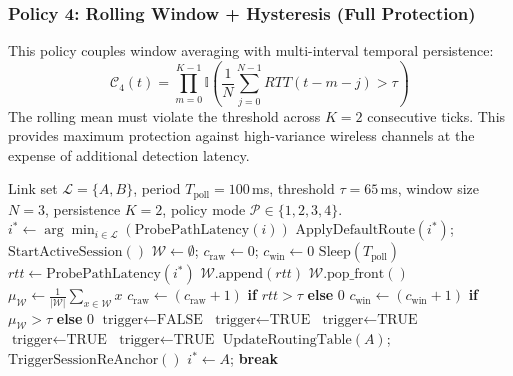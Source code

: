 \documentclass[conference]{IEEEtran}
\begin{document}
{\subsubsection{Policy 4: Rolling Window + Hysteresis (Full Protection)}
This policy couples window averaging with multi-interval temporal persistence:
\begin{equation}
\mathcal{C}_{4}(t) = \prod_{m=0}^{K-1} \mathbb{I}\left( \frac{1}{N}\sum_{j=0}^{N-1} RTT(t - m - j) > \tau \right)
\end{equation}
The rolling mean must violate the threshold across $K=2$ consecutive ticks. This provides maximum protection against high-variance wireless channels at the expense of additional detection latency.
}

\begin{algorithm}[htbp]
\caption{\textcolor{extensioncolor}{Unified Steering Engine with $2 \times 2$ Policy Selection}}
\label{alg:steering}
\begin{algorithmic}[1]
\REQUIRE Link set $\mathcal{L} = \{A, B\}$, period $T_{\text{poll}} = 100$\,ms, threshold $\tau = 65$\,ms, window size $N = 3$, persistence $K = 2$, policy mode $\mathcal{P} \in \{1, 2, 3, 4\}$.
\STATE $i^* \leftarrow \arg\min_{i \in \mathcal{L}} (\text{ProbePathLatency}(i))$
\STATE $\text{ApplyDefaultRoute}(i^*)$; \quad $\text{StartActiveSession}()$
\STATE $\mathcal{W} \leftarrow \emptyset$; \quad $c_{\text{raw}} \leftarrow 0$; \quad $c_{\text{win}} \leftarrow 0$
    \STATE $\text{Sleep}(T_{\text{poll}})$
    \STATE $rtt \leftarrow \text{ProbePathLatency}(i^*)$
    \STATE $\mathcal{W}.\text{append}(rtt)$
        \STATE $\mathcal{W}.\text{pop\_front}()$
    \ENDIF
    \STATE $\mu_{\mathcal{W}} \leftarrow \frac{1}{|\mathcal{W}|}\sum_{x \in \mathcal{W}} x$
    \STATE $c_{\text{raw}} \leftarrow (c_{\text{raw}} + 1)$ \textbf{if} $rtt > \tau$ \textbf{else} $0$
    \STATE $c_{\text{win}} \leftarrow (c_{\text{win}} + 1)$ \textbf{if} $\mu_{\mathcal{W}} > \tau$ \textbf{else} $0$
    \STATE $\text{trigger} \leftarrow \text{FALSE}$
     \STATE $\text{trigger} \leftarrow \text{TRUE}$
     \STATE $\text{trigger} \leftarrow \text{TRUE}$
     \STATE $\text{trigger} \leftarrow \text{TRUE}$
     \STATE $\text{trigger} \leftarrow \text{TRUE}$
    \ENDIF
        \STATE $\text{UpdateRoutingTable}(A)$; \quad $\text{TriggerSessionReAnchor}()$
        \STATE $i^* \leftarrow A$; \quad \textbf{break}
    \ENDIF
\ENDWHILE
\end{algorithmic}
\end{algorithm}
\end{document}
